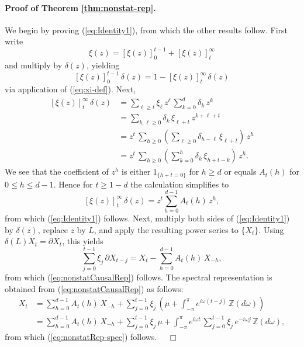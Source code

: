 \documentclass[a4paper]{book}
\def\ZZ{\mathbb Z}
\begin{document}
\paragraph{Proof of Theorem  \ref{thm:nonstat-rep}.}  
  We begin by proving (\ref{eq:Identity1}), from which the other results follow.
 First write
 \[
  \xi (z) = {[ \xi (z) ]}_0^{t-1} + {[ \xi (z)]}_t^{\infty}
 \]
  and multiply by $\delta (z)$, yielding
\[
  {[ \xi (z) ]}_0^{t-1} \, \delta (z) = 1 -  {[ \xi (z)]}_t^{\infty}  \, \delta (z)
\]
via application of (\ref{eq:xi-def}).  Next, 
\begin{align*}
  {[ \xi (z)]}_t^{\infty}  \, \delta (z) & = 
     \sum_{\ell \geq t} \xi_{\ell} \, z^{\ell}
     \, \sum_{k=0}^d \delta_k \, z^k \\
  & =   \sum_{k, \ell \geq 0} \delta_k \, \xi_{\ell+t} \, z^{k+\ell+t}  \\
  & = z^t \, \sum_{h \geq 0}  \left( \sum_{\ell \geq 0} 
  \delta_{h-\ell} \, \xi_{\ell+t} \right) \, z^h \\
    & = z^t \, \sum_{h \geq 0}  \left( \sum_{k=0}^h 
  \delta_{k} \, \xi_{h+t-k} \right) \, z^h.
\end{align*}
 We see that the coefficient of $z^h$ is either $1_{ \{ h+t =0 \} }$ for $h \geq d$
  or equals $A_t (h)$ for $0 \leq h \leq d-1$.  Hence for $t \geq 1-d$ the calculation
  simplifies to
\[
 {[ \xi (z)]}_t^{\infty}  \, \delta (z) =  z^t \sum_{h=0}^{d-1} A_t (h) \, z^h,
\]
 from which  (\ref{eq:Identity1}) follows. 
 Next, multiply both sides of (\ref{eq:Identity1}) by $\delta (z)$, replace $z$ by $L$,
  and apply the resulting power series to $\{ X_t \}$.  Using
  $\delta (L) X_t = \partial X_t$, this yields
  \[
   \sum_{j=0}^{t-1} \xi_j \, \partial X_{t-j} = 
    X_t - \sum_{h=0}^{d-1} A_{t} (h) \, X_{-h},
\]
 from which (\ref{eq:nonstatCausalRep}) follows.  The spectral representation is
  obtained from (\ref{eq:nonstatCausalRep}) as follows:
\begin{align*}
 X_t  & = \sum_{h=0}^{d-1} A_{t} (h) \, X_{-h} + 
  \sum_{j=0}^{t-1} \xi_j \,  \left( \mu + 
  \int_{-\pi}^{\pi} e^{i \omega (t-j)}  \, \ZZ (d\omega) \right) \\
  & = \sum_{h=0}^{d-1} A_{t} (h) \, X_{-h} + 
  \sum_{j=0}^{t-1} \xi_j \, \mu  +
    \int_{-\pi}^{\pi} e^{i \omega t } \, \sum_{j=0}^{t-1} \xi_j \,e^{-i \omega j}
    \, \ZZ (d\omega),
\end{align*}
  from which (\ref{eq:nonstatRep-spec}) follows.  $\quad \Box$
 
\vspace{.5cm}
  
\end{document}
